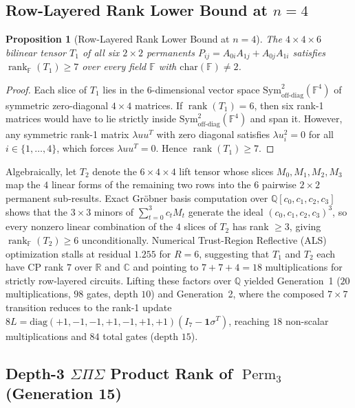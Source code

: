 \documentclass[11pt,a4paper]{article}
\newtheorem{proposition}[theorem]{Proposition}
\newcommand{\Perm}{\operatorname{Perm}}
\newcommand{\rank}{\operatorname{rank}}
\begin{document}
\subsection{Row-Layered Rank Lower Bound at $n = 4$}

\begin{proposition}[Row-Layered Rank Lower Bound at $n = 4$]
\label{prop:row_layered}
The $4 \times 4 \times 6$ bilinear tensor $T_1$ of all six $2 \times 2$ permanents $P_{ij} = A_{0i} A_{1j} + A_{0j} A_{1i}$ satisfies $\rank_{\mathbb{F}}(T_1) \ge 7$ over every field $\mathbb{F}$ with $\mathrm{char}(\mathbb{F}) \neq 2$.
\end{proposition}

\begin{proof}
Each slice of $T_1$ lies in the 6-dimensional vector space $\mathrm{Sym}^2_{\text{off-diag}}(\mathbb{F}^4)$ of symmetric zero-diagonal $4 \times 4$ matrices. If $\rank(T_1) = 6$, then six rank-1 matrices would have to lie strictly inside $\mathrm{Sym}^2_{\text{off-diag}}(\mathbb{F}^4)$ and span it. However, any symmetric rank-1 matrix $\lambda u u^T$ with zero diagonal satisfies $\lambda u_i^2 = 0$ for all $i \in \{1,\dots,4\}$, which forces $\lambda u u^T = 0$. Hence $\rank(T_1) \ge 7$.
\end{proof}

Algebraically, let $T_2$ denote the $6 \times 4 \times 4$ lift tensor whose slices $M_0, M_1, M_2, M_3$ map the $4$ linear forms of the remaining two rows into the $6$ pairwise $2 \times 2$ permanent sub-results. Exact Gr\"obner basis computation over $\mathbb{Q}[c_0,c_1,c_2,c_3]$ shows that the $3 \times 3$ minors of $\sum_{t=0}^3 c_t M_t$ generate the ideal $(c_0,c_1,c_2,c_3)^3$, so every nonzero linear combination of the $4$ slices of $T_2$ has rank $\ge 3$, giving $\rank_{\mathbb{F}}(T_2) \ge 6$ unconditionally. Numerical Trust-Region Reflective (ALS) optimization stalls at residual $1.255$ for $R = 6$, suggesting that $T_1$ and $T_2$ each have CP rank $7$ over $\mathbb{R}$ and $\mathbb{C}$ and pointing to $7 + 7 + 4 = 18$ multiplications for strictly row-layered circuits. Lifting these factors over $\mathbb{Q}$ yielded Generation~1 ($20$ multiplications, $98$ gates, depth $10$) and Generation~2, where the composed $7 \times 7$ transition reduces to the rank-1 update $8L = \mathrm{diag}(+1,-1,-1,+1,-1,+1,+1)(I_7 - \mathbf{1}\sigma^T)$, reaching $18$ non-scalar multiplications and $84$ total gates (depth $15$).

\subsection{Depth-3 $\Sigma\Pi\Sigma$ Product Rank of $\Perm_3$ (Generation 15)}
\end{document}

